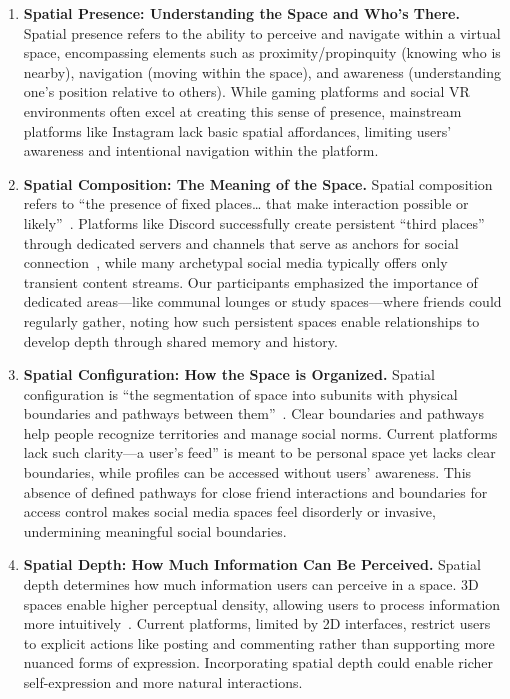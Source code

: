 \begin{enumerate}
    \item \textbf{Spatial Presence: Understanding the Space and Who's There.} Spatial presence refers to the ability to perceive and navigate within a virtual space, encompassing elements such as proximity/propinquity (knowing who is nearby), navigation (moving within the space), and awareness (understanding one's position relative to others). While gaming platforms and social VR environments often excel at creating this sense of presence, mainstream platforms like Instagram lack basic spatial affordances, limiting users' awareness and intentional navigation within the platform.
    \item \textbf{Spatial Composition: The Meaning of the Space.} Spatial composition refers to ``the presence of fixed places\ldots{} that make interaction possible or likely''~\cite{AdlerSmall-2019-RoleSpaceTies-n}. Platforms like Discord successfully create persistent ``third places'' through dedicated servers and channels that serve as anchors for social connection~\cite{Kim-2025-Discord-third-place}, while many archetypal social media typically offers only transient content streams. Our participants emphasized the importance of dedicated areas---like communal lounges or study spaces---where friends could regularly gather, noting how such persistent spaces enable relationships to develop depth through shared memory and history.
    \item \textbf{Spatial Configuration: How the Space is Organized.} Spatial configuration is ``the segmentation of space into subunits with physical boundaries and pathways between them''~\cite{AdlerSmall-2019-RoleSpaceTies-n}. Clear boundaries and pathways help people recognize territories and manage social norms. Current platforms lack such clarity---a user's feed'' is meant to be personal space yet lacks clear boundaries, while profiles can be accessed without users' awareness. This absence of defined pathways for close friend interactions and boundaries for access control makes social media spaces feel disorderly or invasive, undermining meaningful social boundaries.
    \item \textbf{Spatial Depth: How Much Information Can Be Perceived.} Spatial depth determines how much information users can perceive in a space. 3D spaces enable higher perceptual density, allowing users to process information more intuitively~\cite{kumar2004effect, mcintire2014stereoscopic, tavanti20012d}. Current platforms, limited by 2D interfaces, restrict users to explicit actions like posting and commenting rather than supporting more nuanced forms of expression. Incorporating spatial depth could enable richer self-expression and more natural interactions.
\end{enumerate}

